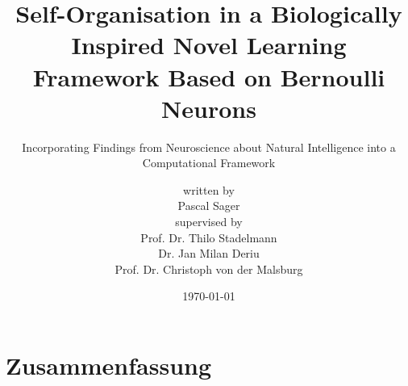 \documentclass[
    fontsize=10pt,
    twoside=true,
    numbers=noenddot
]{cls/phdbyphd}
\theoremstyle{plain}
\begin{document}

\titlehead{Master of Science in Engineering with Specialisation in Data Science}

\subject{Master Thesis}
\title[Self-Organisation in a Biologically Inspired Novel Learning Framework Based on Bernoulli Neurons]{Self-Organisation in a Biologically Inspired Novel Learning Framework Based on Bernoulli Neurons}
\subtitle{Incorporating Findings from Neuroscience about Natural Intelligence into a Computational Framework}

\author[Pascal Sager]{{\small written by}\\Pascal Sager\\[1ex]  {\small supervised by}\\{\large Prof. Dr. Thilo Stadelmann}\\{\large Dr. Jan Milan Deriu}\\{\large Prof. Dr. Christoph von der Malsburg}\\[4ex]}

\date{\today}

\publishers{Zurich University of Applied Sciences\\Centre for Artificial Intelligence}

\frontmatter
{}


\maketitle


\setlength{\textheight}{23.5cm}

\chapter*{Zusammenfassung}
    
    
\end{document}
